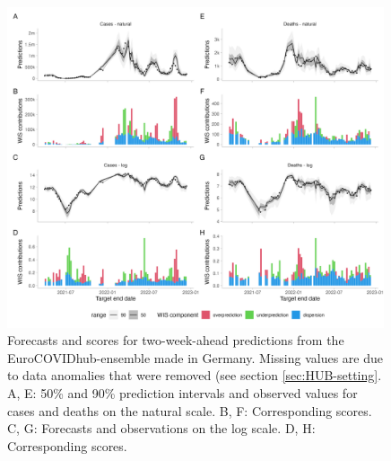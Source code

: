 \documentclass[10pt,letterpaper]{article} %
\begin{document}
\begin{figure}[h!]
    \centering
    \includegraphics[width=0.99\textwidth]{../output/figures/HUB-model-comparison-ensemble.png}
    \caption{
    Forecasts and scores for two-week-ahead predictions from the EuroCOVIDhub-ensemble made in Germany. Missing values are due to data anomalies that were removed (see section \ref{sec:HUB-setting}. 
    A, E: 50\% and 90\% prediction intervals and observed values for cases and deaths on the natural scale. B, F: Corresponding scores. C, G: Forecasts and observations on the log scale. D, H: Corresponding scores. 
    }
    \label{fig:HUB-model-comparison-ensemble}
\end{figure}
\end{document}
